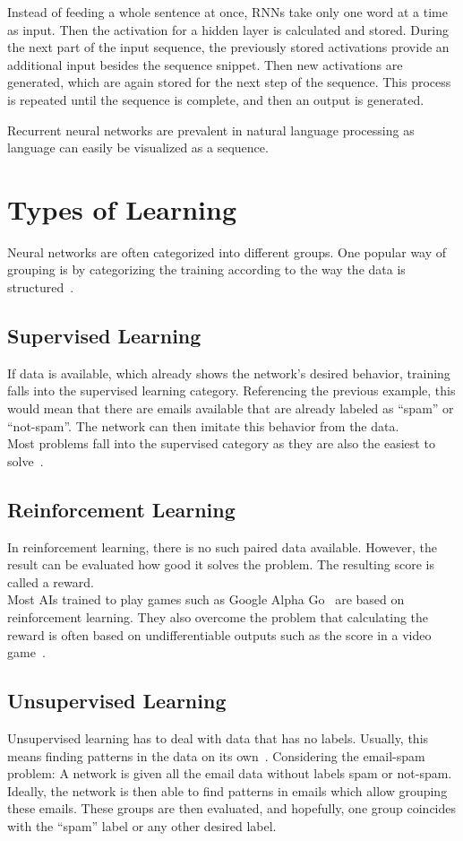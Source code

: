 Instead of feeding a whole sentence at once, RNNs take only one word at a time as input.
Then the activation for a hidden layer is calculated and stored.
During the next part of the input sequence, the previously stored activations provide an additional input besides the sequence snippet.
Then new activations are generated, which are again stored for the next step of the sequence.
This process is repeated until the sequence is complete, and then an output is generated.

Recurrent neural networks are prevalent in natural language processing as language can easily be visualized as a sequence.

\section{Types of Learning}
Neural networks are often categorized into different groups.
One popular way of grouping is by categorizing the training according to the way the data is structured~\cite{grosse, ommer}.

\subsection{Supervised Learning}
If data is available, which already shows the network's desired behavior, training falls into the supervised learning category.
Referencing the previous example, this would mean that there are emails available that are already labeled as ``spam'' or ``not-spam''.
The network can then imitate this behavior from the data. \\
Most problems fall into the supervised category as they are also the easiest to solve~\cite{grosse}.

\subsection{Reinforcement Learning}
In reinforcement learning, there is no such paired data available.
However, the result can be evaluated how good it solves the problem.
The resulting score is called a reward.\\
Most AIs trained to play games such as Google Alpha Go~\cite{alphago} are based on reinforcement learning.
They also overcome the problem that calculating the reward is often based on undifferentiable outputs such as the score in a video game~\cite{grosse}.

\subsection{Unsupervised Learning}
Unsupervised learning has to deal with data that has no labels.
Usually, this means finding patterns in the data on its own~\cite{grosse}.
Considering the email-spam problem: A network is given all the email data without labels spam or not-spam.
Ideally, the network is then able to find patterns in emails which allow grouping these emails.
These groups are then evaluated, and hopefully, one group coincides with the ``spam'' label or any other desired label.

